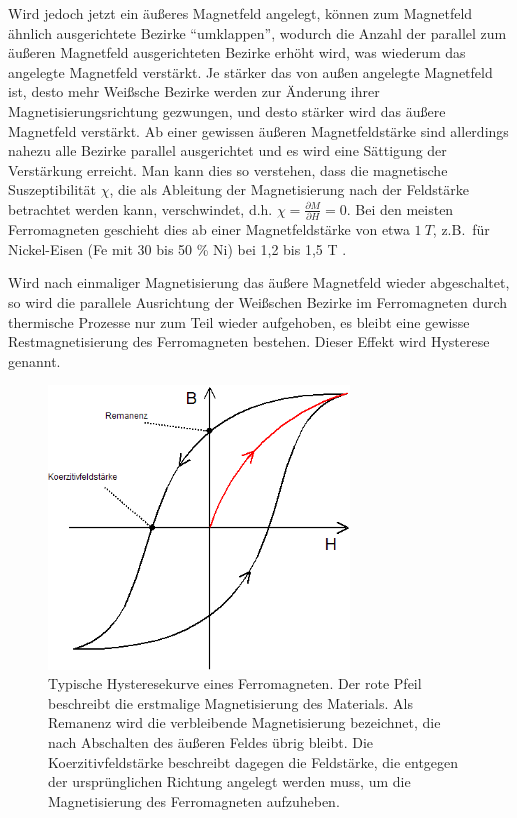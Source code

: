 \documentclass[bigchapter,colorback,accentcolor=tud4b,linedtoc,11pt]{tudreport}
\begin{document}
Wird jedoch jetzt ein äußeres Magnetfeld angelegt, können zum Magnetfeld ähnlich ausgerichtete Bezirke "`umklappen"', wodurch die Anzahl der parallel zum äußeren Magnetfeld ausgerichteten Bezirke erhöht wird, was wiederum das angelegte Magnetfeld verstärkt. Je stärker das von außen angelegte Magnetfeld ist, desto mehr Weißsche Bezirke werden zur Änderung ihrer Magnetisierungsrichtung gezwungen, und desto stärker wird das äußere Magnetfeld verstärkt. Ab einer gewissen äußeren Magnetfeldstärke sind allerdings nahezu alle Bezirke parallel ausgerichtet und es wird eine Sättigung der Verstärkung erreicht. Man kann dies so verstehen, dass die magnetische Suszeptibilität $\chi$, die als Ableitung der Magnetisierung nach der Feldstärke betrachtet werden kann, verschwindet, d.h. $\chi = \frac{\partial M}{\partial H} = 0$. Bei den meisten Ferromagneten geschieht dies ab einer Magnetfeldstärke von etwa $1~T$, z.B.\ für Nickel-Eisen (Fe mit 30 bis 50 \% Ni) bei 1,2 bis 1,5 T \cite{wiki}.

Wird nach einmaliger Magnetisierung das äußere Magnetfeld wieder abgeschaltet, so wird die parallele Ausrichtung der Weißschen Bezirke im Ferromagneten durch thermische Prozesse nur zum Teil wieder aufgehoben, es bleibt eine gewisse Restmagnetisierung des Ferromagneten bestehen. Dieser Effekt wird Hysterese genannt.

\begin{figure}[H]
\centering
\includegraphics[width=80mm]{img/hysterese.png}
\caption{Typische Hysteresekurve eines Ferromagneten. Der rote Pfeil beschreibt die erstmalige Magnetisierung des Materials. Als Remanenz wird die verbleibende Magnetisierung bezeichnet, die nach Abschalten des äußeren Feldes übrig bleibt. Die Koerzitivfeldstärke beschreibt dagegen die Feldstärke, die entgegen der ursprünglichen Richtung angelegt werden muss, um die Magnetisierung des Ferromagneten aufzuheben\cite{hysterese}.}
\end{figure}
\end{document}
